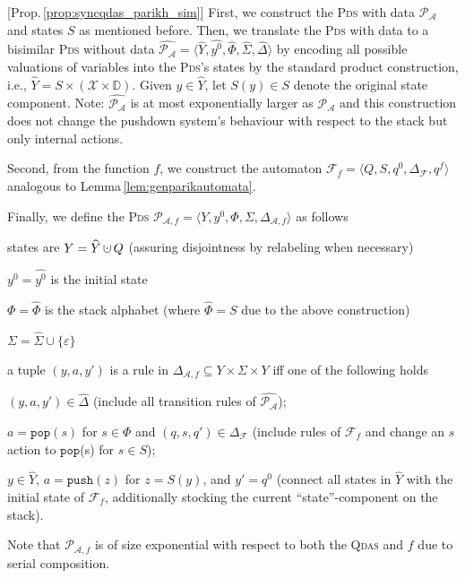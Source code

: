 \documentclass[runningheads,oribibl,]{article}
\newcommand{\tuple}[1]{\langle#1\rangle\xspace}
\newcommand{\Aa}{\ensuremath{\mathcal{A}}\xspace}
\newcommand{\Ff}{\ensuremath{\mathcal{F}}\xspace}
\newcommand{\Pp}{\ensuremath{\mathcal{P}}\xspace}
\newcommand{\Xx}{\ensuremath{\mathcal{X}}\xspace}
\newcommand{\e}{\ensuremath{\varepsilon}\xspace}
\newcommand{\DD}{\ensuremath{\mathbb{D}}\xspace}
\newcommand{\cfont}[1]{\ensuremath{\mathtt{#1}}\xspace}
\DeclareMathOperator{\dotcup}{\mathaccent\cdot\cup}
\newcommand{\pds}{\textsc{Pds}\xspace}
\newcommand{\qdas}{\textsc{Qdas}\xspace}
\newcommand{\push}{\ensuremath{\cfont{push}}}
\newcommand{\pop}{\ensuremath{\cfont{pop}}}
\newenvironment{myitemize}{\begin{list}{\labelitemi}{\setlength{\topsep}{4pt}\setlength{\partopsep}{0pt}
\setlength{\itemsep}{0pt}
\setlength{\itemindent}{0ex}
\setlength{\listparindent}{0ex}
\setlength{\leftmargin}{4ex}\setlength{\labelwidth}{2ex}
}}
{\end{list}}
\newenvironment{proof}{\noindent{\it Proof.\hspace*{.5cm}}}{}
\begin{document}
\propsyncqdasparikhsim*
\begin{proof}[Prop.\,\ref{prop:syncqdas_parikh_sim}]
  First, we construct the \pds with data $\Pp_\Aa$ and states $S$
  as mentioned before. Then, we
  translate the \pds with data to a bisimilar \pds without data
  $\widehat{\Pp_\Aa}=\tuple{\widehat{Y},\widehat{y^0},
  \widehat{\Phi},\widehat{\Sigma}, \widehat{\Delta}}$
  by encoding all possible valuations of variables into the {\pds}'s states by the
  standard product construction, i.e.,
  $\widehat{Y}=S\times\left(\Xx\times\DD\right)$. Given $y\in\widehat{Y}$,
  let $S(y)\in S$ denote the original state component.
  Note: $\widehat{\Pp_\Aa}$ is at most
  exponentially larger as $\Pp_\Aa$ and  this construction does not change the
  pushdown system's behaviour with respect to the stack but only internal
  actions.

  Second, from the function $f$, we construct the automaton
  $\Ff_f=\tuple{Q,S,q^0,\Delta_\Ff,q^f}$ analogous to
  Lemma\,\ref{lem:genparikautomata}.

  \newcommand{\Aaf}{{\Aa,f}}
  Finally, we define the \pds
  $\Pp_{\Aaf}=\tuple{Y,y^0,\Phi,\Sigma,\Delta_\Aaf}$
  as follows
  \begin{myitemize}
    \item states are $Y=\widehat{Y}\dotcup Q$ (assuring
       disjointness by relabeling when necessary)
    \item $y^0=\widehat{y^0}$ is the initial state
    \item $\Phi=\widehat{\Phi}$ is the stack alphabet
      (where $\widehat{\Phi}=S$ due to the above construction)
    \item $\Sigma=\widehat{\Sigma} \cup\{\e\}$
    \item a tuple $(y,a,y')$ is a rule in $\Delta_\Aaf\subseteq
      Y\times\Sigma\times Y$ iff one of the following
      holds
      \begin{myitemize}
        \item $(y,a,y')\in\widehat{\Delta}$ (include all transition rules of
          $\widehat{\Pp_\Aa}$);
        \item $a=\pop(s)$ for $s\in\Phi$ and $(q,s,q')\in\Delta_\Ff$ (include
          rules of $\Ff_f$ and change an $s$ action to {\pop(s)} for $s\in S$);
        \item $y\in \widehat{Y}$, $a=\push(z)$ for $z=S(y)$,
          and $y'=q^0$ (connect all states in
          $\widehat{Y}$ with the initial state of $\Ff_f$, additionally stocking
          the current ``state''-component on the stack).
      \end{myitemize}
  \end{myitemize}
  Note that $\Pp_{\Aaf}$ is of size exponential with respect to both the \qdas
  and $f$ due to serial composition.


\end{proof}
\end{document}
